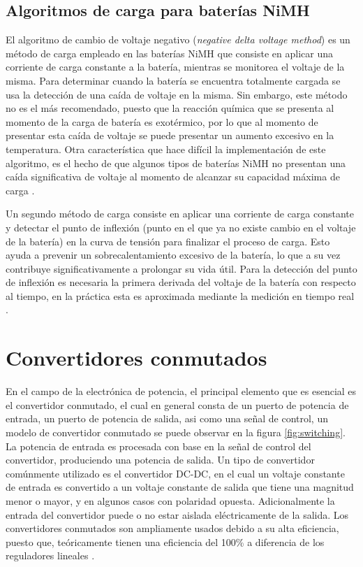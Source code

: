 \subsection{Algoritmos de carga para baterías NiMH}
\label{sec:alg_nimh}
El algoritmo de cambio de voltaje negativo (\textit{negative delta voltage method}) es un método de carga empleado
en las baterías NiMH que consiste en aplicar una corriente de carga constante a la batería, mientras se monitorea 
el voltaje de la misma. Para determinar cuando la batería se encuentra totalmente cargada se usa la detección de una 
caída de voltaje en la misma. Sin embargo, este método no es el más recomendado, puesto que la reacción química que se 
presenta al momento de la carga de batería es exotérmico, por lo que al momento de presentar esta caída de voltaje se 
puede presentar un aumento excesivo en la temperatura. Otra característica que hace difícil la implementación de este 
algoritmo, es el hecho de que algunos tipos de baterías NiMH no presentan una caída significativa de voltaje al momento
de alcanzar su capacidad máxima de carga \cite{nicolai_nickel-cadmium_1995}.

Un segundo método de carga consiste en aplicar una corriente de carga constante y 
detectar el punto de inflexión (punto en el que ya no existe cambio
en el voltaje de la batería) en la curva de tensión para finalizar el proceso de carga.
Esto ayuda a prevenir un sobrecalentamiento
excesivo de la batería, lo que a su vez contribuye significativamente a prolongar su vida útil. 
Para la detección del punto de inflexión es necesaria la primera derivada del voltaje de la batería con respecto 
al tiempo, en la práctica esta es aproximada mediante la medición en tiempo real \cite{nicolai_nickel-cadmium_1995}.

\section{Convertidores conmutados}

En el campo de la electrónica de potencia, el principal elemento que es esencial es el convertidor conmutado, el cual
en general consta de un puerto de potencia de entrada, un puerto de potencia de salida, asi como una señal de control,
un modelo de convertidor conmutado se puede observar en la figura \ref{fig:switching}. La potencia de entrada es procesada
con base en la señal de control del convertidor, produciendo una potencia de salida. Un tipo de convertidor comúnmente utilizado
es el convertidor DC-DC, en el cual un voltaje constante de entrada es convertido a un voltaje constante de salida que tiene 
una magnitud menor o mayor, y en algunos casos con polaridad opuesta. Adicionalmente la entrada del convertidor puede o no estar  aislada eléctricamente de la salida. Los convertidores conmutados son
ampliamente usados debido a su alta eficiencia, puesto que, teóricamente tienen una eficiencia del 
100\% a diferencia de los reguladores lineales \cite{erickson_fundamentals_2020}.

